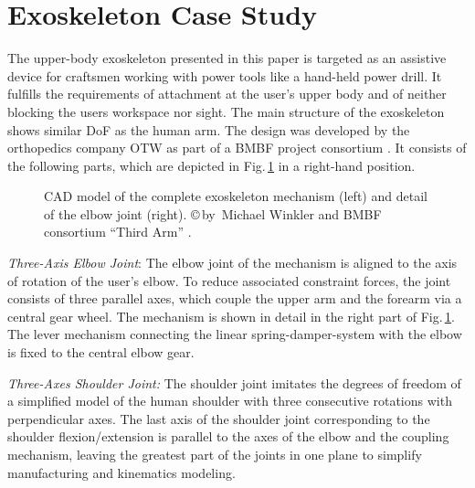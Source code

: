 \documentclass{svproc}
\begin{document}
\section{Exoskeleton Case Study}
\label{sec:exo_scenario}

The upper-body exoskeleton presented in this paper is targeted as an assistive device for craftsmen working with power tools like a hand-held power drill.
It fulfills the requirements of attachment at the user's upper body and of neither blocking the users workspace nor sight.
The main structure of the exoskeleton shows similar DoF as the human arm.
The design was developed by the orthopedics company OTW as part of a BMBF project consortium \cite{NuelleSchTapLil2017}.
It consists of the following parts, which are depicted in Fig.\,\ref{fig:KAS5_CAD} in a right-hand position.

\begin{figure}[b!]
    \vspace{-0.6cm}
    
    \vspace{-0.4cm}
    \caption{CAD model of the complete exoskeleton mechanism (left) and detail of the elbow joint (right).
    \copyright\,by~Michael Winkler and BMBF consortium ``Third Arm'' \cite{NuelleSchTapLil2017}.}
    \label{fig:KAS5_CAD}
\end{figure}


\emph{Three-Axis Elbow Joint}:
The elbow joint of the mechanism is aligned to the axis of rotation of the user's elbow.
To reduce associated constraint forces, the joint consists of three parallel axes, which couple the upper arm and the forearm via a central gear wheel.
The mechanism is shown in detail in the right part of Fig.\,\ref{fig:KAS5_CAD}.
The lever mechanism connecting the linear spring-damper-system with the elbow is fixed to the central elbow gear.

\emph{Three-Axes Shoulder Joint:}
The shoulder joint imitates the degrees of freedom of a simplified model of the human shoulder with three consecutive rotations with perpendicular axes.
The last axis of the shoulder joint corresponding to the shoulder flexion/extension is parallel to the axes of the elbow and the coupling mechanism, leaving the greatest part of the joints in one plane to simplify manufacturing and kinematics modeling.
\end{document}
